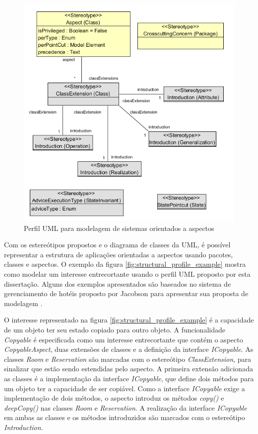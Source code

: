 \begin{figure} \centering
	\includegraphics[scale=0.8]{img/full_profile.png}
	\caption{Perfil UML para modelagem de sistemas orientados a aspectos}\label{fig:uml_profile}
\end{figure}

Com os estereótipos propostos e o diagrama de classes da UML, é possível representar a estrutura de aplicações orientadas a aspectos usando
pacotes, classes e aspectos. O exemplo da figura \ref{fig:structural_profile_example} mostra como modelar um interesse entrecortante usando o perfil
UML proposto por esta dissertação. Alguns dos exemplos apresentados são baseados no sistema de gerenciamento de hotéis proposto por Jacobson para
apresentar sua proposta de modelagem \cite{Jacobson:2004:ASD:1062430}. 

O interesse representado na figura \ref{fig:structural_profile_example} é a capacidade de um objeto ter seu estado copiado para outro objeto.
A funcionalidade \textit{Copyable} é especificada como um interesse entrecortante que contém o aspecto \textit{CopyableAspect}, duas extensões de classes e a definição da interface \textit{ICopyable}.
As classes \textit{Room} e \textit{Reservation} são marcadas com o estereótipo \textit{ClassExtension}, para sinalizar que estão sendo estendidas pelo aspecto. A primeira extensão adicionada as
classes é a implementação da interface \textit{ICopyable}, que define dois métodos para um objeto ter a capacidade de ser copiável. Como a interface
\textit{ICopyable} exige a implementação de dois métodos, o aspecto introduz os métodos \textit{copy()} e \textit{deepCopy()} nas classes \textit{Room} e \textit{Reservation}. 
A realização da interface \textit{ICopyable} em ambas as classes e os métodos introduzidos são marcados com o estereótipo \textit{Introduction}.


